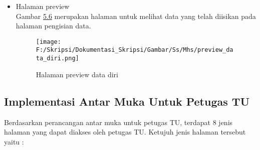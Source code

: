 \begin{itemize}
	\item Halaman preview\\
	Gambar \hyperlink{halaman_preview_data_diri}{5.6} merupakan halaman untuk melihat data yang telah diisikan pada halaman pengisian data.
	\begin{figure}[H]
	\centering
		\texttt{[image: F:/Skripsi/Dokumentasi\_Skripsi/Gambar/Ss/Mhs/preview\_data\_diri.png]}
		\caption{Halaman preview data diri}
		\label{fig:halaman_preview_data_diri}
	\end{figure}
\end{itemize}

\subsection{Implementasi Antar Muka Untuk Petugas TU}
\label{sec:implementasi_antar_muka_petugas_tu}
Berdasarkan perancangan antar muka untuk petugas TU, terdapat 8 jenis halaman yang dapat diakses oleh petugas TU. Ketujuh jenis halaman tersebut yaitu :
